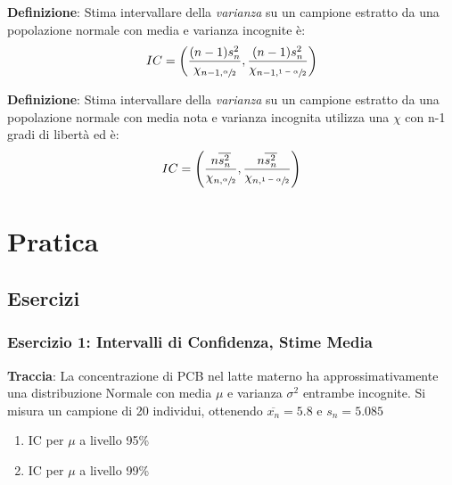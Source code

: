 \ind \textbf{Definizione}: Stima intervallare della \textit{varianza} su un campione estratto da una popolazione normale con media e varianza incognite è: $$IC =  \left( \dfrac{(n-1) s_n^2}{ \chi_{n-1, \sfrac{\alpha}{2}}}, \dfrac{(n-1) s_n^2}{ \chi_{n-1, \sfrac{ 1 - \alpha}{2}}} \right)$$

\ind \textbf{Definizione}: Stima intervallare della \textit{varianza} su un campione estratto da una popolazione normale con media nota e varianza incognita utilizza una $\chi$ con n-1 gradi di libertà ed è: $$IC = \left( \dfrac{n \overline{s_n^2}}{ \chi_{n, \sfrac{\alpha}{2}}}, \dfrac{n \overline{s_n^2}}{ \chi_{n, \sfrac{ 1 - \alpha}{2}}} \right)$$
\pagebreak 

\section{Pratica}

\subsection{Esercizi}

\subsubsection{Esercizio 1: Intervalli di Confidenza, Stime Media}

\textbf{Traccia}: La concentrazione di PCB nel latte materno ha approssimativamente una distribuzione Normale con media $\mu$ e varianza $\sigma^2$ entrambe incognite. Si misura un campione di 20 individui, ottenendo $\overline{x_n}=5.8$ e $s_n=5.085$
\begin{enumerate}
    \item IC per $\mu$ a livello 95\%
    \item IC per $\mu$ a livello 99\%
\end{enumerate}

